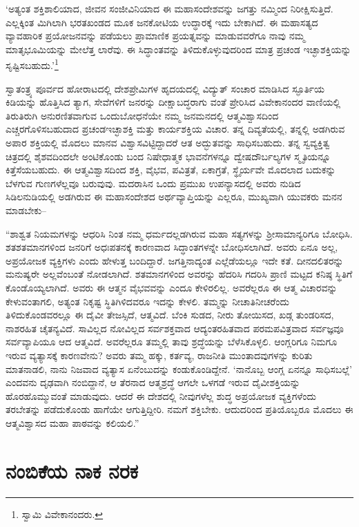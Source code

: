 ‘ಅತ್ಯಂತ ಶಕ್ತಿಶಾಲಿಯಾದ, ಜೀವನ ಸಂಜೀವಿನಿಯಾದ ಈ ಮಹಾಸಂದೇಶವನ್ನು ಜಗತ್ತು ನಮ್ಮಿಂದ ನಿರೀಕ್ಷಿಸುತ್ತಿದೆ. ಎಲ್ಲಕ್ಕಿಂತ ಮಿಗಿಲಾಗಿ ಭರತಖಂಡದ ಮೂಕ ಜನಕೋಟಿಯ ಉದ್ಧಾರಕ್ಕೆ ಇದು ಬೇಕಾಗಿದೆ. ಈ ಮಹಾಸತ್ಯದ ವ್ಯಾವಹಾರಿಕ ಪ್ರಯೋಜನವನ್ನು ಪಡೆಯಲು ಪ್ರಾಮಾಣಿಕ ಪ್ರಯತ್ನವನ್ನು ಮಾಡುವವರೆಗೂ ನಾವು ನಮ್ಮ ಮಾತೃಭೂಮಿಯನ್ನು ಮೇಲೆತ್ತ ಲಾರೆವು. ಈ ಸಿದ್ಧಾಂತವನ್ನು ತಿಳಿದುಕೊಳ್ಳುವುದರಿಂದ ಮಾತ್ರ ಪ್ರಚಂಡ ಇಚ್ಛಾಶಕ್ತಿಯನ್ನು ಸೃಷ್ಟಿಸಬಹುದು.’\footnote{ ಸ್ವಾಮಿ ವಿವೇಕಾನಂದರು.}

ಸ್ವಾತಂತ್ರ್ಯ ಪೂರ್ವದ ಹೋರಾಟದಲ್ಲಿ ದೇಶಪ್ರೇಮಿಗಳ ಹೃದಯದಲ್ಲಿ ವಿದ್ಯುತ್ ಸಂಚಾರ ಮಾಡಿಸಿದ ಸ್ಫೂರ್ತಿಯ ಕಿಡಿಯನ್ನು ಹೊತ್ತಿಸಿದ ತ್ಯಾಗ, ಸೇವೆಗಳಿಗೆ ಜನರನ್ನು ದೀಕ್ಷಾಬದ್ಧರಾಗು ವಂತೆ ಪ್ರೇರಿಸಿದ ವಿವೇಕಾನಂದರ ವಾಣಿಯಲ್ಲಿ ತಿರುತಿರುಗಿ ಅನುರಣಿತವಾಗುವ ಒಂದು\break ಬೋಧನೆಯೇ ನಮ್ಮ ಜನಮನದಲ್ಲಿ ಆತ್ಮವಿಶ್ವಾಸದಿಂದ ಎಚ್ಚರಗೊಳಿಸಬಹುದಾದ ಪ್ರಚಂಡ\break ಇಚ್ಛಾಶಕ್ತಿ ಮತ್ತು ಕಾರ್ಯಶಕ್ತಿಯ ವಿಚಾರ. ತನ್ನ ದಿವ್ಯತೆಯಲ್ಲಿ, ತನ್ನಲ್ಲಿ ಅಡಗಿರುವ ಅಪಾರ ಶಕ್ತಿಯಲ್ಲಿ ಮೊದಲು ಮಾನವ ವಿಶ್ವಾಸವಿಟ್ಟಿದ್ದಾದರೆ ಆತ ಅದ್ಭುತವನ್ನು ಸಾಧಿಸಬಹುದು. ತನ್ನ ಸ್ವವ್ಯಕ್ತಿತ್ವ ಚಿತ್ರದಲ್ಲಿ ಶೈಶವದಿಂದಲೇ ಅಂಟಿಕೊಂಡು ಬಂದ ನಿಷೇಧಾತ್ಮಕ ಭಾವನೆಗಳನ್ನೂ ದ್ವೇಷದೌರ್ಬಲ್ಯಗಳ ಸ್ಮೃತಿಯನ್ನೂ ಕಿತ್ತೆಸೆಯಬಹುದು. ಈ ಆತ್ಮವಿಶ್ವಾಸದಿಂದ ಶಕ್ತಿ, ವೈಭವ, ಪವಿತ್ರತೆ, ಏಕಾಗ್ರತೆ, ಸ್ಥೈರ್ಯವೇ ಮೊದಲಾದ ಬದುಕನ್ನು ಬೆಳಗುವ ಗುಣಗಳೆಲ್ಲವೂ ಬರುವುವು. ಮದರಾಸಿನ ಒಂದು ಪ್ರಮುಖ ಉಪನ್ಯಾಸದಲ್ಲಿ ಅವರು ನುಡಿದ ಸಿಡಿಲನುಡಿಯಲ್ಲಿ ಅಡಗಿರುವ ಈ ಮಹಾ\-ಸಂದೇಶದ ಅರ್ಥವ್ಯಾಪ್ತಿಯನ್ನು ಎಲ್ಲರೂ, ಮುಖ್ಯವಾಗಿ ಯುವಕರು ಮನನ ಮಾಡಬೇಕು–

“ಶಾಶ್ವತ ನಿಯಮಗಳನ್ನು ಆಧರಿಸಿ ನಿಂತ ನಮ್ಮ ಧರ್ಮದಲ್ಲಡಗಿರುವ ಮಹಾ ಸತ್ಯಗಳನ್ನು ಶ‍್ರೀಸಾಮಾನ್ಯರಿಗೂ ಬೋಧಿಸಿ. ಶತಶತಮಾನಗಳಿಂದ ಜನರಿಗೆ ಅಧಃಪತನಕ್ಕೆ ಕಾರಣವಾದ ಸಿದ್ಧಾಂತಗಳನ್ನೇ ಬೋಧಿಸಲಾಗಿದೆ. ಅವರು ಏನೂ ಅಲ್ಲ, ಅಪ್ರಯೋಜಕ ವ್ಯಕ್ತಿಗಳು ಎಂದು ಹೇಳುತ್ತ ಬಂದಿದ್ದಾರೆ. ಜಗತ್ತಿನಾದ್ಯಂತ ಎಲ್ಲೆಡೆಯಲ್ಲೂ ಇದೇ ಕತೆ. ದೀನದಲಿತರನ್ನು ಮನುಷ್ಯರೇ ಅಲ್ಲವೆಂಬಂತೆ ನೋಡಲಾಗಿದೆ. ಶತಮಾನಗಳಿಂದ ಅವರನ್ನು ಹೆದರಿಸಿ ಗದರಿಸಿ ಪ್ರಾಣಿ ಮಟ್ಟದ ಕನಿಷ್ಠ ಸ್ಥಿತಿಗೆ ಕೊಂಡೊಯ್ಯಲಾಗಿದೆ. ಅವರು ಈ ಆತ್ಮನ ವೈಭವವನ್ನು ಎಂದೂ ಕೇಳಿರಲಿಲ್ಲ. ಅವರೆಲ್ಲರೂ ಈ ಆತ್ಮ ವಿಚಾರವನ್ನು ಕೇಳುವಂತಾಗಲಿ, ಅತ್ಯಂತ ನಿಕೃಷ್ಟ ಸ್ಥಿತಿಗಿಳಿದವರೂ ಇದನ್ನು ಕೇಳಲಿ. ತಮ್ಮನ್ನು ನೀಚಾತಿನೀಚರೆಂದು ತಿಳಿದುಕೊಂಡವರಲ್ಲೂ ಈ ದೈವೀ ತೇಜಸ್ಸಿದೆ, ಆತ್ಮವಿದೆ. ಬೆಂಕಿ ಸುಡದ, ನೀರು ತೋಯಿಸದ, ಖಡ್ಗ ತುಂಡರಿಸದ, ನಾಶರಹಿತ ಚೈತನ್ಯವಿದೆ. ಸಾವಿಲ್ಲದ ನೋವಿಲ್ಲದ ಸರ್ವಶಕ್ತವಾದ ಆದ್ಯಂತರಹಿತವಾದ ಪರಮಪವಿತ್ರವಾದ ಸರ್ವಜ್ಞವೂ ಸರ್ವವ್ಯಾಪಿಯೂ ಆದ ಆತ್ಮವಿದೆ. ಅವರೆಲ್ಲರೂ ತಮ್ಮಲ್ಲಿ ತಾವು ಶ್ರದ್ಧೆಯನ್ನು ಬೆಳೆಸಿಕೊಳ್ಳಲಿ. ಆಂಗ್ಲರಿಗೂ ನಿಮಗೂ ಇರುವ ವ್ಯತ್ಯಾಸಕ್ಕೆ ಕಾರಣವೇನು? ಅವರು ತಮ್ಮ ಹಕ್ಕು, ಕರ್ತವ್ಯ, ರಾಜನೀತಿ ಮುಂತಾದವುಗಳನ್ನು ಕುರಿತು ಮಾತನಾಡಲಿ, ನಾನು ನಿಜವಾದ ವ್ಯತ್ಯಾಸ ಏನೆಂಬು\-ದನ್ನು ಕಂಡುಕೊಂಡಿದ್ದೇನೆ. ‘ನಾನೊಬ್ಬ ಆಂಗ್ಲ ಏನನ್ನೂ ಸಾಧಿಸಬಲ್ಲೆ’ ಎಂದವನು ದೃಢವಾಗಿ ನಂಬಿದ್ದಾನೆ, ಆ ತೆರನಾದ ಆತ್ಮಶ್ರದ್ಧೆ ಆಗಲೇ ಒಳಗಡೆ ಇರುವ ದೈವೀಶಕ್ತಿಯನ್ನು ಹೊರಹೊಮ್ಮುವಂತೆ ಮಾಡುವುದು. ಆದರೆ ಈ ದೇಶದಲ್ಲಿ ನೀವುಗಳೆಲ್ಲ ಶುದ್ಧ ಅಪ್ರಯೋಜಕ ವ್ಯಕ್ತಿಗಳೆಂದು ತರಬೇತನ್ನು ಪಡೆದುಕೊಂಡು ಹಾಗೆಯೇ ಆಗುತ್ತಿದ್ದೀರಿ. ನಮಗೆ ಶಕ್ತಿಬೇಕು. ಆದುದರಿಂದ ಪ್ರತಿಯೊಬ್ಬರೂ ಮೊದಲು ಈ ಆತ್ಮವಿಶ್ವಾಸದ ಮಹಾ ಪಾಠವನ್ನು ಕಲಿಯಲಿ.”


\section*{ನಂಬಿಕೆಯ ನಾಕ ನರಕ}

